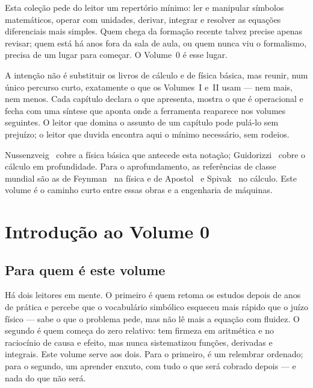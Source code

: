 \documentclass[12pt,a4paper]{article}
\numberwithin{equation}{section}
\numberwithin{table}{section}
\numberwithin{figure}{section}
\begin{document}
Esta coleção pede do leitor um repertório mínimo: ler e manipular símbolos
matemáticos, operar com unidades, derivar, integrar e resolver as equações
diferenciais mais simples. Quem chega da formação recente talvez precise
apenas revisar; quem está há anos fora da sala de aula, ou quem nunca viu o
formalismo, precisa de um lugar para começar. O Volume~0 é esse lugar.

A intenção não é substituir os livros de cálculo e de física básica, mas
reunir, num único percurso curto, exatamente o que os Volumes~I e~II usam ---
nem mais, nem menos. Cada capítulo declara o que apresenta, mostra o que é
operacional e fecha com uma síntese que aponta onde a ferramenta reaparece
nos volumes seguintes. O leitor que domina o assunto de um capítulo pode
pulá-lo sem prejuízo; o leitor que duvida encontra aqui o mínimo necessário,
sem rodeios.

Nussenzveig~\cite{nussenzveig} cobre a física básica que antecede esta
notação; Guidorizzi~\cite{guidorizzi2013} cobre o cálculo em profundidade.
Para o aprofundamento, as referências de classe mundial são as de
Feynman~\cite{feynman1963} na física e de Apostol~\cite{apostol1967} e
Spivak~\cite{spivak2008} no cálculo. Este volume é o caminho curto entre
essas obras e a engenharia de máquinas.


\clearpage
\section{Introdução ao Volume 0}\label{sec:v0-intro}

\subsection{Para quem é este volume}

Há dois leitores em mente. O primeiro é quem retoma os estudos depois de
anos de prática e percebe que o vocabulário simbólico esqueceu mais rápido
que o juízo físico --- sabe o que o problema pede, mas não lê mais a equação
com fluidez. O segundo é quem começa do zero relativo: tem firmeza em
aritmética e no raciocínio de causa e efeito, mas nunca sistematizou
funções, derivadas e integrais. Este volume serve aos dois. Para o primeiro,
é um relembrar ordenado; para o segundo, um aprender enxuto, com tudo o que
será cobrado depois --- e nada do que não será.
\end{document}
